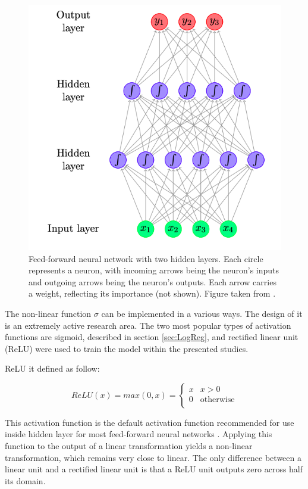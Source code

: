 \begin{figure}[!ht]
\centering
\includegraphics[scale=0.7]{figures/NN.png}
\caption{ Feed-forward neural network with two hidden layers.  Each circle represents a neuron, with incoming arrows being the neuron’s inputs and outgoing arrows being the neuron’s outputs. Each arrow carries a weight, reflecting its importance (not shown). Figure taken from \cite{text_processing}.
}
\label{fig:NN}
\end{figure} 
 
 
The non-linear function $\sigma$ can be implemented in a various ways. The design of it is an extremely active research area. The two most popular types of activation functions are sigmoid, described in section \ref{sec:LogReg}, and rectified linear unit (ReLU)  were used to train the model within the presented studies.  

ReLU \cite{relu} it defined as follow: 

\begin{equation}
ReLU(x) = max(0,x)= \left\{ \begin{array}{ll}
x & x>0\\
0 & \textrm{otherwise}\\
\end{array} \right.
\end{equation}

This activation function is the default activation function recommended for use inside hidden layer for most feed-forward neural networks \cite{DLBook}. Applying this function to the output of a linear transformation yields a non-linear transformation, which remains very close to linear. The only diﬀerence between a linear unit and a rectiﬁed linear unit is that a ReLU unit outputs zero across half its domain. 

